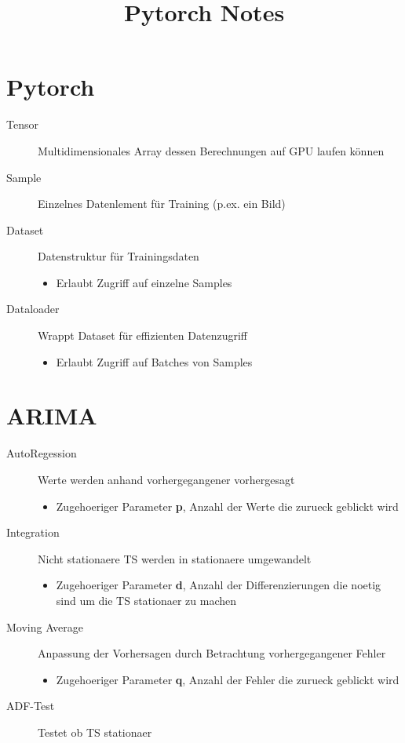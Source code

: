 \documentclass{article}
\title{Pytorch Notes}
\begin{document}
\maketitle

\section{Pytorch}
\begin{description}
    \item[Tensor] Multidimensionales Array dessen Berechnungen auf GPU laufen können
    \item[Sample] Einzelnes Datenlement für Training (p.ex. ein Bild)
    \item[Dataset] Datenstruktur für Trainingsdaten \begin{itemize}
            \item Erlaubt Zugriff auf einzelne Samples
        \end{itemize}
    \item[Dataloader] Wrappt Dataset für effizienten Datenzugriff \begin{itemize}
            \item Erlaubt Zugriff auf Batches von Samples
        \end{itemize}
\end{description}

\section{ARIMA}
\begin{description}
    \item[AutoRegession] Werte werden anhand vorhergegangener vorhergesagt \begin{itemize}
            \item Zugehoeriger Parameter \textbf{p}, Anzahl der Werte die zurueck geblickt wird
        \end{itemize}
    \item[Integration] Nicht stationaere TS werden in stationaere umgewandelt \begin{itemize}
            \item Zugehoeriger Parameter \textbf{d}, Anzahl der Differenzierungen die noetig sind um die TS stationaer zu machen
        \end{itemize}
    \item[Moving Average] Anpassung der Vorhersagen durch Betrachtung vorhergegangener Fehler \begin{itemize}
            \item Zugehoeriger Parameter \textbf{q}, Anzahl der Fehler die zurueck geblickt wird
        \end{itemize}
    \item[ADF-Test] Testet ob TS stationaer
\end{description}
\end{document}
